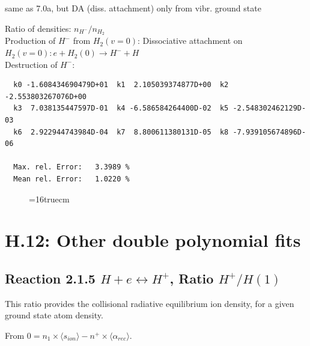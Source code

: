 \documentclass[12pt,dvips]{article}
\begin{document}
 same as 7.0a, but DA (diss. attachment) only from vibr. ground state

  Ratio of densities: $n_{H^-}/n_{H_2}$\\
  Production of $H^-$ from $H_2(v=0)$: Dissociative attachment on $H_2(v=0):  e+H_2(0) \rightarrow H^- + H$    \\
  Destruction of $H^-$:

\begin{small}\begin{verbatim}
  k0 -1.608434690479D+01  k1  2.105039374877D+00  k2 -2.553803267076D+00
  k3  7.038135447597D-01  k4 -6.586584264400D-02  k5 -2.548302462129D-03
  k6  2.922944743984D-04  k7  8.800611380131D-05  k8 -7.939105674896D-06

  Max. rel. Error:   3.3989 %
  Mean rel. Error:   1.0220 %
\end{verbatim}\end{small}


\begin{figure} \label{7.0}
\epsfxsize=16truecm
\end{figure}

\newpage

\section{H.12: Other double polynomial fits}

\subsection{
Reaction 2.1.5   $H + e \leftrightarrow H^+$,  Ratio $H^+/H(1)$
}
This ratio provides the collisional radiative equilibrium ion
density, for a given ground state atom density.

From $0 = n_1 \times  \langle s_{ion} \rangle - n^+ \times \langle\alpha_{rec} \rangle$.
\end{document}
